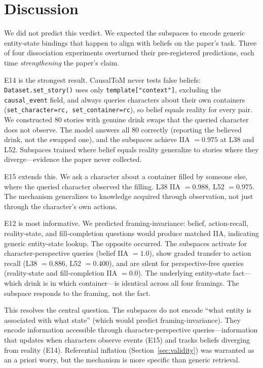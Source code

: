 \documentclass{article}
\begin{document}
\section{Discussion}
\label{sec:discussion}

We did not predict this verdict. We expected the subspaces to encode generic entity-state bindings that happen to align with beliefs on the paper's task. Three of four dissociation experiments overturned their pre-registered predictions, each time \emph{strengthening} the paper's claim.

E14 is the strongest result. CausalToM never tests false beliefs: \texttt{Dataset.set\_story()} uses only \texttt{template["context"]}, excluding the \texttt{causal\_event} field, and always queries characters about their own containers (\texttt{set\_character=rc, set\_container=rc}), so belief equals reality for every pair. We constructed 80 stories with genuine drink swaps that the queried character does not observe. The model answers all 80 correctly (reporting the believed drink, not the swapped one), and the subspaces achieve IIA $= 0.975$ at L38 and L52. Subspaces trained where belief equals reality generalize to stories where they diverge---evidence the paper never collected.

E15 extends this. We ask a character about a container filled by someone else, where the queried character observed the filling. L38 IIA $= 0.988$, L52 $= 0.975$. The mechanism generalizes to knowledge acquired through observation, not just through the character's own actions.

E12 is most informative. We predicted framing-invariance: belief, action-recall, reality-state, and fill-completion questions would produce matched IIA, indicating generic entity-state lookup. The opposite occurred. The subspaces activate for character-perspective queries (belief IIA $= 1.0$), show graded transfer to action recall (L38 $= 0.886$, L52 $= 0.400$), and are silent for perspective-free queries (reality-state and fill-completion IIA $= 0.0$). The underlying entity-state fact---which drink is in which container---is identical across all four framings. The subspace responds to the framing, not the fact.

This resolves the central question. The subspaces do not encode ``what entity is associated with what state'' (which would predict framing-invariance). They encode information accessible through character-perspective queries---information that updates when characters observe events (E15) and tracks beliefs diverging from reality (E14). Referential inflation (Section~\ref{sec:validity}) was warranted as an a priori worry, but the mechanism is more specific than generic retrieval.
\end{document}
